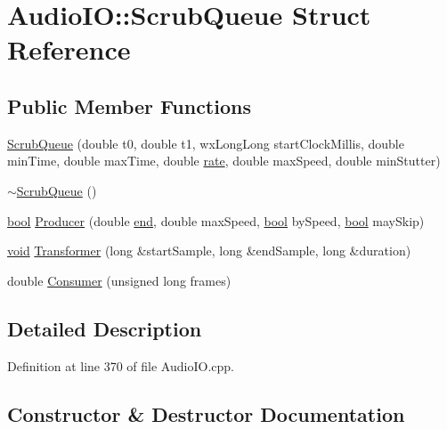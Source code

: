 \hypertarget{struct_audio_i_o_1_1_scrub_queue}{}\section{Audio\+IO\+:\+:Scrub\+Queue Struct Reference}
\label{struct_audio_i_o_1_1_scrub_queue}
\subsection*{Public Member Functions}
\begin{DoxyCompactItemize}
\item 
\hyperlink{struct_audio_i_o_1_1_scrub_queue_a7eb251d863eea3783ad88a66698336fa}{Scrub\+Queue} (double t0, double t1, wx\+Long\+Long start\+Clock\+Millis, double min\+Time, double max\+Time, double \hyperlink{seqread_8c_ad89d3fac2deab7a9cf6cfc8d15341b85}{rate}, double max\+Speed, double min\+Stutter)
\item 
\hyperlink{struct_audio_i_o_1_1_scrub_queue_a049c7e6d7d8013c6b94656ffa7e17708}{$\sim$\+Scrub\+Queue} ()
\item 
\hyperlink{mac_2config_2i386_2lib-src_2libsoxr_2soxr-config_8h_abb452686968e48b67397da5f97445f5b}{bool} \hyperlink{struct_audio_i_o_1_1_scrub_queue_aacdebc37a30f6490881eab5ea6061ad9}{Producer} (double \hyperlink{convtest_8m_afb358f48b1646c750fb9da6c6585be2b}{end}, double max\+Speed, \hyperlink{mac_2config_2i386_2lib-src_2libsoxr_2soxr-config_8h_abb452686968e48b67397da5f97445f5b}{bool} by\+Speed, \hyperlink{mac_2config_2i386_2lib-src_2libsoxr_2soxr-config_8h_abb452686968e48b67397da5f97445f5b}{bool} may\+Skip)
\item 
\hyperlink{sound_8c_ae35f5844602719cf66324f4de2a658b3}{void} \hyperlink{struct_audio_i_o_1_1_scrub_queue_a38ec93e4511b7d077a4f572f81a18489}{Transformer} (long \&start\+Sample, long \&end\+Sample, long \&duration)
\item 
double \hyperlink{struct_audio_i_o_1_1_scrub_queue_a38aca6a1949928445a39a567cedadf48}{Consumer} (unsigned long frames)
\end{DoxyCompactItemize}


\subsection{Detailed Description}


Definition at line 370 of file Audio\+I\+O.\+cpp.



\subsection{Constructor \& Destructor Documentation}
